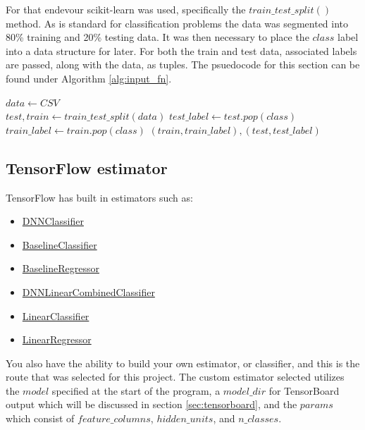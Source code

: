 \documentclass{article}
\begin{document}
  For that endevour scikit-learn was used, specifically the 
  $train\_test\_split()$ method. As is standard for classification problems the 
  data was segmented into 80\% training and 20\% testing data. It was then 
  necessary to place the $class$ label into a data structure for later. For 
  both the train and test data, associated labels are passed, along with the 
  data, as tuples. The psuedocode for this section can be found under Algorithm 
  \ref{alg:input_fn}.
  \begin{algorithm}
    \caption{$input\_fn()$}
    \label{alg:input_fn}
    \begin{algorithmic}
      \STATE $data \gets CSV$\\
      \STATE $test, train \gets train\_test\_split(data)$
      \STATE $test\_label \gets test.pop(class)$
      \STATE $train\_label \gets train.pop(class)$
      \RETURN $(train, train\_label), (test,test\_label)$
    \end{algorithmic}
  \end{algorithm}
\subsection{TensorFlow estimator}
  TensorFlow has built in estimators such as:
  \begin{itemize}
    \item \href{https://www.tensorflow.org/api_docs/python/tf/estimator/DNNClassifier}{DNNClassifier}
    \item \href{https://www.tensorflow.org/api_docs/python/tf/estimator/BaselineClassifier}{BaselineClassifier}
    \item \href{https://www.tensorflow.org/api_docs/python/tf/estimator/BaselineRegressor}{BaselineRegressor}
    \item \href{https://www.tensorflow.org/api_docs/python/tf/estimator/DNNLinearCombinedClassifier}{DNNLinearCombinedClassifier}
    \item \href{https://www.tensorflow.org/api_docs/python/tf/estimator/LinearClassifier}{LinearClassifier}
    \item \href{https://www.tensorflow.org/api_docs/python/tf/estimator/LinearRegressor}{LinearRegressor}
  \end{itemize}
  You also have the ability to build your own estimator, or classifier, and 
  this is the route that was selected for this project. The custom estimator 
  selected utilizes the $model$ specified at the start of the program, a 
  $model\_dir$ for TensorBoard output which will be discussed in section 
  \ref{sec:tensorboard}, and the $params$ which consist of $feature\_columns$, 
  $hidden\_units$, and $n\_classes$.
\end{document}

